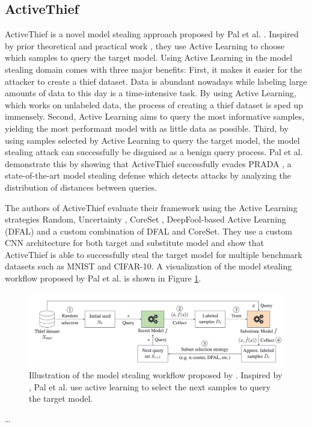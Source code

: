 \subsection{ActiveThief}
\label{sec:Related_work:Model_Stealing:ActiveThief}
ActiveThief is a novel model stealing approach proposed by Pal et al. \cite{pal2020activethief}. Inspired by prior theoretical \cite{chandrasekaran2020exploring}
and practical work \cite{shi2018active}, they use Active Learning to choose which samples to query the target model. Using Active Learning in the model stealing
domain comes with three major benefits: First, it makes it easier for the attacker to create a thief dataset. Data is abundant nowadays while labeling large amounts
of data to this day is a time-intensive task. By using Active Learning, which works on unlabeled data, the process of creating a thief dataset is sped up immensely.
Second, Active Learning aims to query the most informative samples, yielding the most performant model with as little data as possible. Third, by using samples selected
by Active Learning to query the target model, the model stealing attack can successfully be disguised as a benign query process. Pal et al. demonstrate this by showing 
that ActiveThief successfully evades PRADA \cite{juuti2019prada}, a state-of-the-art model stealing defense which detects attacks by analyzing the distribution of distances
between queries. \par
The authors of ActiveThief evaluate their framework using the Active Learning strategies Random, Uncertainty \cite{lewis1994sequential}, CoreSet \cite{sener2017active},
DeepFool-based Active Learning (DFAL) \cite{ducoffe2018adversarial} and a custom combination of DFAL and CoreSet. They use a custom CNN architecture for both target and
substitute model and show that ActiveThief is able to successfully steal the target model for multiple benchmark datasets such as MNIST and CIFAR-10. A visualization of
the model stealing workflow proposed by Pal et al. is shown in Figure \ref{fig:ActiveThief}.

\begin{figure} [ht]
    \centering
    \includegraphics[width=.9\linewidth]{images/ActiveThief_Idea.png}
    \caption[Visualization of ActiveThief]{Illustration of the model stealing workflow proposed by \cite{pal2020activethief}. Inspired by
    \cite{chandrasekaran2020exploring}, Pal et al. use active learning to select the next samples to query the target model.}
    \label{fig:ActiveThief}
\end{figure}

\dots
